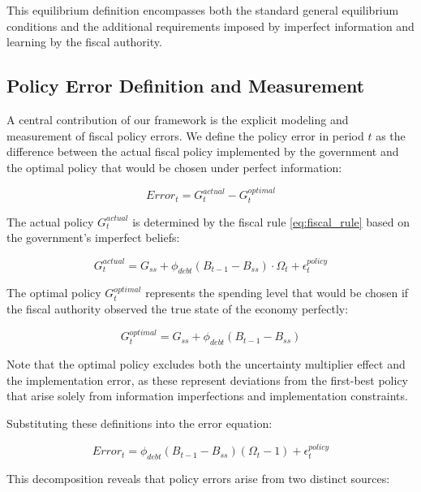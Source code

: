 \documentclass[5p,authoryear]{elsarticle}
\begin{document}
This equilibrium definition encompasses both the standard general equilibrium conditions and the additional requirements imposed by imperfect information and learning by the fiscal authority.

\subsection{Policy Error Definition and Measurement}

A central contribution of our framework is the explicit modeling and measurement of fiscal policy errors. We define the policy error in period $t$ as the difference between the actual fiscal policy implemented by the government and the optimal policy that would be chosen under perfect information:

\begin{equation}
Error_t = G_t^{actual} - G_t^{optimal}
\label{eq:policy_error_definition}
\end{equation}

The actual policy $G_t^{actual}$ is determined by the fiscal rule \eqref{eq:fiscal_rule} based on the government's imperfect beliefs:

\begin{equation}
G_t^{actual} = G_{ss} + \phi_{debt} (B_{t-1} - B_{ss}) \cdot \Omega_t + \epsilon_t^{policy}
\label{eq:actual_policy}
\end{equation}

The optimal policy $G_t^{optimal}$ represents the spending level that would be chosen if the fiscal authority observed the true state of the economy perfectly:

\begin{equation}
G_t^{optimal} = G_{ss} + \phi_{debt} (B_{t-1} - B_{ss})
\label{eq:optimal_policy}
\end{equation}

Note that the optimal policy excludes both the uncertainty multiplier effect and the implementation error, as these represent deviations from the first-best policy that arise solely from information imperfections and implementation constraints.

Substituting these definitions into the error equation:

\begin{equation}
Error_t = \phi_{debt} (B_{t-1} - B_{ss}) (\Omega_t - 1) + \epsilon_t^{policy}
\label{eq:policy_error_components}
\end{equation}

This decomposition reveals that policy errors arise from two distinct sources:
\end{document}
